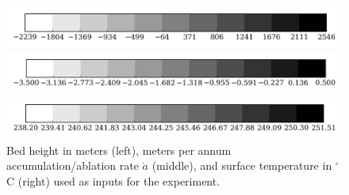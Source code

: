 \begin{figure}
  \begin{minipage}[b]{0.30\linewidth}
    \includegraphics[width=1.0\textwidth]{images/EISMINT_II/vars/B_cb.jpg}
  \end{minipage}
  \quad
  \begin{minipage}[b]{0.30\linewidth}
    \includegraphics[width=1.0\textwidth]{images/EISMINT_II/vars/adot_cb.jpg}
  \end{minipage}
  \quad
  \begin{minipage}[b]{0.30\linewidth}
    \includegraphics[width=1.0\textwidth]{images/EISMINT_II/vars/T_s_cb.jpg}
  \end{minipage}
  \caption[]{Bed height in meters (left), \ie meters per annum accumulation/ablation rate $\dot{a}$ (middle), and surface temperature in $^\circ$C (right) used as inputs for the experiment.}
\end{figure}


